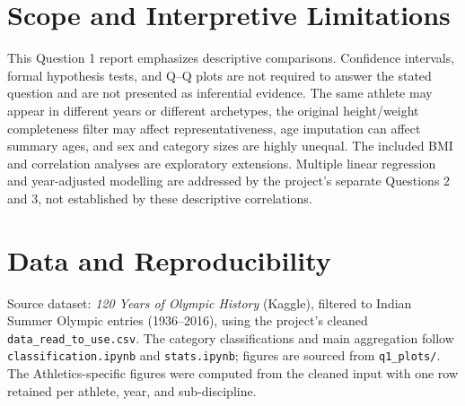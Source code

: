 \documentclass[11pt,a4paper]{article}
\begin{document}
\section{Scope and Interpretive Limitations}
This Question 1 report emphasizes descriptive comparisons. Confidence intervals,
formal hypothesis tests, and Q--Q plots are not required to answer the stated
question and are not presented as inferential evidence. The same athlete may
appear in different years or different archetypes, the original height/weight
completeness filter may affect representativeness, age imputation can affect
summary ages, and sex and category sizes are highly unequal. The included
BMI and correlation analyses are exploratory extensions. Multiple linear
regression and year-adjusted modelling are addressed by the project's
separate Questions 2 and 3, not established by these descriptive correlations.

\section*{Data and Reproducibility}
Source dataset: \emph{120 Years of Olympic History} (Kaggle), filtered to
Indian Summer Olympic entries (1936--2016), using the project's cleaned
\texttt{data\_read\_to\_use.csv}. The category classifications and
main aggregation follow \texttt{classification.ipynb} and
\texttt{stats.ipynb}; figures are sourced from \texttt{q1\_plots/}.
The Athletics-specific figures were computed from the cleaned input with
one row retained per athlete, year, and sub-discipline.
\end{document}
